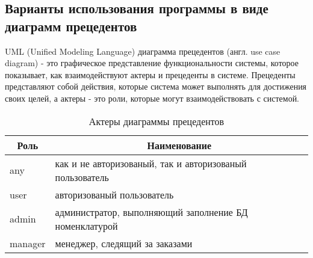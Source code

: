 \subsection{Варианты использования программы в виде диаграмм прецедентов}

UML (Unified Modeling Language) диаграмма прецедентов (англ. use case diagram) - это графическое представление функциональности системы, которое показывает,
как взаимодействуют актеры и прецеденты в системе.
Прецеденты представляют собой действия, которые система может выполнять для достижения своих целей,
а актеры - это роли, которые могут взаимодействовать с системой.

\begin{table}[!htb]
    \centering

    \caption{Актеры диаграммы прецедентов}
    \label{tab:use_case_roles}

    \begin{tabular}{|p{2cm}|p{15cm}|}
        \hline
        \multicolumn{1}{|c|}{Роль}
        & \multicolumn{1}{c|}{Наименование}
        \\ \hline

        any & как и не авторизованый, так и авторизованый пользователь \\ \hline 
        user & авторизованый пользователь \\ \hline 
        admin & администратор, выполняющий заполнение БД номенклатурой \\ \hline 
        manager & менеджер, следящий за заказами \\ \hline 
    \end{tabular}
\end{table}




